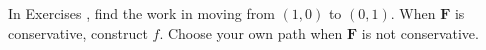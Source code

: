 {\noindent In Exercises} 
{,  find the work in moving from $(1,0)$ to $(0,1)$.  When $\mathbf{F}$ is conservative, construct $f$.  Choose your own path when $\mathbf{F}$ is not conservative.
}
